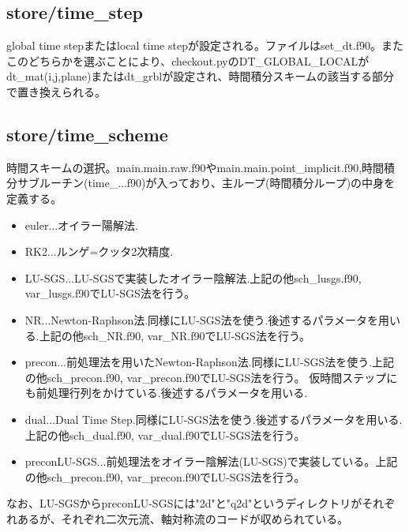 \documentclass{jsarticle}
\begin{document}
\subsection{store/time\_step}%
global time stepまたはlocal time stepが設定される。ファイルはset\_dt.f90。またこのどちらかを選ぶことにより、checkout.pyのDT\_GLOBAL\_LOCALがdt\_mat(i,j,plane)またはdt\_grblが設定され、時間積分スキームの該当する部分で置き換えられる。
\subsection{store/time\_scheme}%
時間スキームの選択。main.main.raw.f90やmain.main.point\_implicit.f90,時間積分サブルーチン(time\_...f90)が入っており、主ループ(時間積分ループ)の中身を定義する。
\begin{itemize}
\item euler...オイラー陽解法.
\item RK2...ルンゲ=クッタ2次精度.
\item LU-SGS...LU-SGSで実装したオイラー陰解法.上記の他sch\_lusgs.f90, var\_lusgs.f90でLU-SGS法を行う。
\item NR...Newton-Raphson法.同様にLU-SGS法を使う.後述するパラメータを用いる.上記の他sch\_NR.f90, var\_NR.f90でLU-SGS法を行う。
\item precon...前処理法を用いたNewton-Raphson法.同様にLU-SGS法を使う.上記の他sch\_precon.f90, var\_precon.f90でLU-SGS法を行う。
仮時間ステップにも前処理行列をかけている.後述するパラメータを用いる.
\item dual...Dual Time Step.同様にLU-SGS法を使う.後述するパラメータを用いる.上記の他sch\_dual.f90, var\_dual.f90でLU-SGS法を行う。
\item preconLU-SGS...前処理法をオイラー陰解法(LU-SGS)で実装している。上記の他sch\_precon.f90, var\_precon.f90でLU-SGS法を行う。
\end{itemize}
なお、LU-SGSからpreconLU-SGSには"2d"と"q2d"というディレクトリがそれぞれあるが、それぞれ二次元流、軸対称流のコードが収められている。
\end{document}
